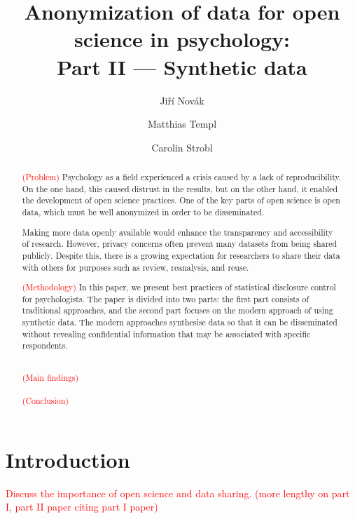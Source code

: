 \documentclass{article}
\title{Anonymization of data for open science in psychology: \\ 
       Part II — Synthetic data
}
\author{Jiří Novák \and 
        Matthias Templ \and 
        Carolin Strobl
        }
\begin{document}
\maketitle

\begin{abstract}
\textcolor{red}{(Problem)} Psychology as a field experienced a crisis caused by a lack of reproducibility. On the one hand, this caused distrust in the results, but on the other hand, it enabled the development of open science practices. One of the key parts of open science is open data, which must be well anonymized in order to be disseminated. 

Making more data openly available would enhance the transparency and accessibility of research. However, privacy concerns often prevent many datasets from being shared publicly. Despite this, there is a growing expectation for researchers to share their data with others for purposes such as review, reanalysis, and reuse.

\textcolor{red}{(Methodology)} In this paper, we present best practices of statistical disclosure control for psychologists. The paper is divided into two parts: the first part consists of traditional approaches, and the second part focuses on the modern approach of using synthetic data.
The modern approaches synthesise data so that it can be disseminated without revealing confidential information that may be associated with specific respondents. 

\\ \textcolor{red}{(Main findings)} \\ 
\\ \textcolor{red}{(Conclusion)} \\ 

\end{abstract}


\section{Introduction}

\textcolor{red}{Discuss the importance of open science and data sharing. (more lengthy on part I, part II paper citing part I paper)}
\end{document}
